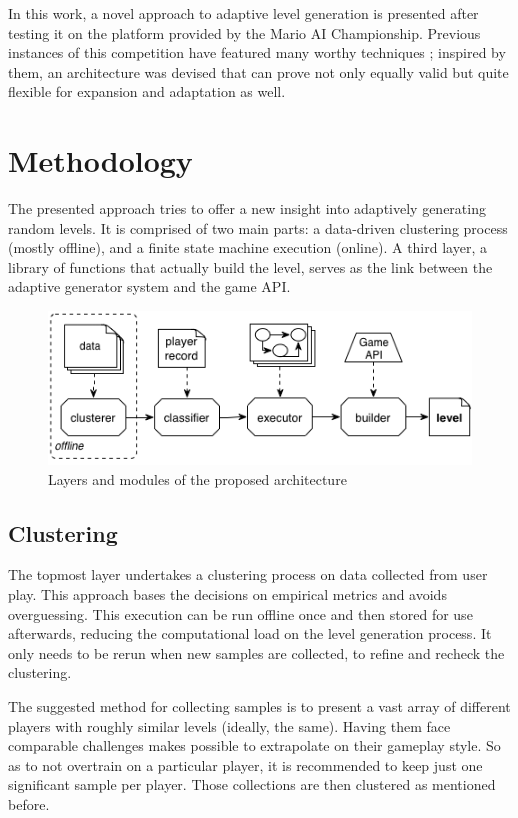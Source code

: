 \documentclass[conference]{IEEEtran}
\begin{document}
In this work, a novel approach to adaptive level generation is presented after testing it on the platform provided by the Mario AI Championship. Previous instances of this competition have featured many worthy techniques \cite{mario2010}; inspired by them, an architecture was devised that can prove not only equally valid but quite flexible for expansion and adaptation as well.

\section{Methodology}

The presented approach tries to offer a new insight into adaptively generating random levels. It is comprised of two main parts: a data-driven clustering process (mostly offline), and a finite state machine execution (online). A third layer, a library of functions that actually build the level, serves as the link between the adaptive generator system and the game API. 

\begin{figure}[htp]
\centerline{\includegraphics[width=1.2\columnwidth]{layers.png}}
\caption{Layers and modules of the proposed architecture}
\label{layers}
\end{figure}

\subsection{Clustering}

The topmost layer undertakes a clustering process on data collected from user play. This approach bases the decisions on empirical metrics and avoids overguessing. This execution can be run offline once and then stored for use afterwards, reducing the computational load on the level generation process. It only needs to be rerun when new samples are collected, to refine and recheck the clustering.

The suggested method for collecting samples is to present a vast array of different players with roughly similar levels (ideally, the same). Having them face comparable challenges makes possible to extrapolate on their gameplay style. So as to not overtrain on a particular player, it is recommended to keep just one significant sample per player. Those collections are then clustered as mentioned before.
\end{document}
